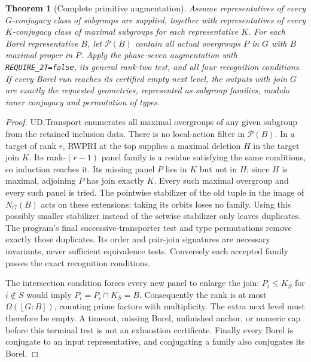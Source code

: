 \documentclass[11pt]{article}
\newtheorem{theorem}{Theorem}\newtheorem{lemma}{Lemma}
\begin{document}
\begin{theorem}[Complete primitive augmentation]
Assume representatives of every $G$-conjugacy class of subgroups are supplied,
together with representatives of every $K$-conjugacy class of maximal
subgroups for each representative $K$. For each Borel representative $B$,
let $\mathcal P(B)$ contain \emph{all} actual overgroups $P$ in $G$ with
$B$ maximal proper in $P$. Apply the phase-seven augmentation with
\texttt{REQUIRE\_2T=false}, its general rank-two test, and all four recognition
conditions. If every Borel run reaches its certified empty next level,
the outputs with join $G$ are exactly the requested geometries, represented
as subgroup families, modulo inner conjugacy and permutation of types.
\end{theorem}
\begin{proof}
UD.Transport enumerates all maximal overgroups of any given subgroup from
the retained inclusion data. There is no local-action filter in
$\mathcal P(B)$. In a target of rank $r$, RWPRI at the top supplies a maximal
deletion $H$ in the target join $K$. Its rank-$(r-1)$ panel family is a
residue satisfying the same conditions, so induction reaches it. Its missing
panel $P$ lies in $K$ but not in $H$; since $H$ is maximal, adjoining $P$
has join exactly $K$. Every such maximal overgroup and every such panel is
tried. The pointwise stabilizer of the old tuple in the image of $N_G(B)$
acts on these extensions; taking its orbits loses no family. Using this
possibly smaller stabilizer instead of the setwise stabilizer only leaves
duplicates. The program's final successive-transporter test and type
permutations remove exactly those duplicates. Its order and pair-join
signatures are necessary invariants, never sufficient equivalence tests.
Conversely each accepted family passes the exact recognition conditions.

The intersection condition forces every new panel to enlarge the join:
$P_i\leq K_S$ for $i\notin S$ would imply $P_i=P_i\cap K_S=B$.
Consequently the rank is at most $\Omega([G:B])$, counting prime factors
with multiplicity. The extra next level must therefore be empty. A timeout,
missing Borel, unfinished anchor, or numeric cap before this terminal test
is not an exhaustion certificate. Finally every Borel is conjugate to an
input representative, and conjugating a family also conjugates its Borel.
\end{proof}
\end{document}
